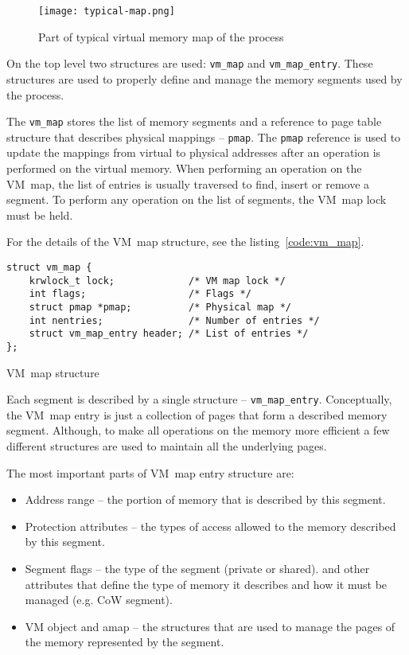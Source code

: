 \begin{figure}
  \centering
  \texttt{[image: typical-map.png]}
  \caption{Part of typical virtual memory map of the process}
  \label{img:typical-vm-map}
\end{figure}

On the top level two structures are used: \texttt{vm_map} and \texttt{vm_map_entry}.
These structures are used to properly define and manage the memory segments used by the process.

The \texttt{vm_map} stores the list of memory segments and a reference to page table structure that describes physical mappings -- \texttt{pmap}.
The \texttt{pmap} reference is used to update the mappings from virtual to physical addresses after an operation is performed on the virtual memory.
When performing an operation on the VM~map, the list of entries is usually traversed to find, insert or remove a segment.
To perform any operation on the list of segments, the VM~map lock must be held.

For the details of the VM~map structure, see the listing~\ref{code:vm_map}.

\begin{listing}
  \begin{verbatim}
struct vm_map {
    krwlock_t lock;             /* VM map lock */
    int flags;                  /* Flags */
    struct pmap *pmap;          /* Physical map */
    int nentries;               /* Number of entries */
    struct vm_map_entry header; /* List of entries */
};
  \end{verbatim}
  \caption{VM~map structure}
  \label{code:vm_map}
\end{listing}

Each segment is described by a single structure -- \texttt{vm_map_entry}.
Conceptually, the VM~map entry is just a collection of pages that form a described memory segment.
Although, to make all operations on the memory more efficient a few different structures are used to maintain all the underlying pages.

The most important parts of VM~map entry structure are:

\begin{itemize}
  \item Address range -- the portion of memory that is described by this segment.
  \item Protection attributes -- the types of access allowed to the memory described by this segment.
  \item Segment flags -- the type of the segment (private or shared).
    and other attributes that define the type of memory it describes and how it must be managed (e.g. CoW segment).
  \item VM object and amap -- the structures that are used to manage the pages of the memory represented by the segment.
\end{itemize}

